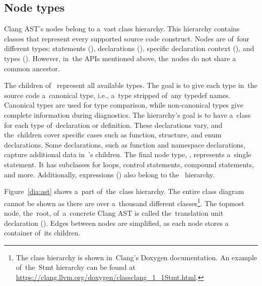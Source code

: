 \subsection{Node types}

Clang AST's nodes belong to a~vast class hierarchy. 
This hierarchy contains classes that represent every supported 
source code construct.
Nodes are of~four different types: statements (), 
declarations (), specific declaration context 
(), and types (). 
However, in~the APIs mentioned above, the~nodes do not share
a common ancestor.

The children of~ represent all available types.
The goal is to give each type in~the source code a~canonical type,
i.e., a~type stripped of~any typedef names. 
Canonical types are used for type comparison, while non-canonical 
types give complete information during diagnostics. 
The  hierarchy's goal is to have a~class for each 
type of~declaration or definition. 
These declarations vary, and the~children cover specific cases 
such as function, structure, and enum declarations. 
Some declarations, such as function and namespace declarations, 
capture additional data in~'s children. 
The final node type, , represents a~single statement. 
It has subclasses for loops, control statements, compound statements, 
and more. 
Additionally, expressions () also belong 
to the~ hierarchy.

Figure~\ref{dia:ast} shows a~part of~the~class hierarchy. 
The entire class diagram cannot be shown as there are over a~thousand 
different classes\footnote{The class hierarchy is shown in~Clang's
Doxygen documentation. An example of~the~Stmt hierarchy can be found
at \url{https://clang.llvm.org/doxygen/classclang_1_1Stmt.html}.}. 
The topmost node, the~root, of~a~concrete Clang AST is called the~translation
unit declaration (). 
Edges between nodes are simplified, as each node stores 
a container of~its children.

